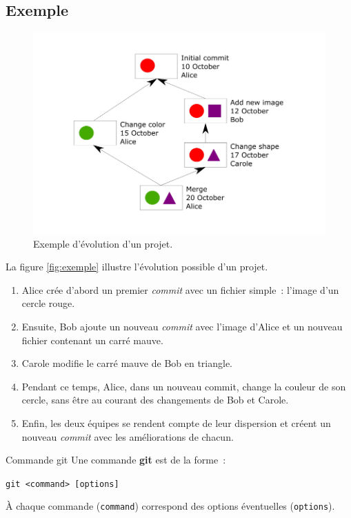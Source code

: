 \documentclass[a4paper,11pt]{style-esi/td}
\newcommand{\git}{\textbf{git}\xspace}
\begin{document}
\subsection{Exemple}

\begin{figure}[h]
	\centering
	\includegraphics[width=.9\linewidth]{img/exemple.png}
	\caption{Exemple d'évolution d'un projet.}
	\label{fig:exemple}
\end{figure}

La figure \vref{fig:exemple} illustre l’évolution possible d’un projet. 

\begin{enumerate}

	\item Alice crée d’abord un premier \textit{commit} avec un fichier simple~: 
		l’image d’un cercle rouge. 
		
	\item Ensuite, Bob ajoute un nouveau \textit{commit} avec l’image d’Alice et un 
		nouveau fichier contenant un carré mauve. 
		
	\item Carole modifie le carré mauve de Bob en triangle. 
		
	\item Pendant ce temps, Alice, dans un nouveau commit, change la couleur de 
		son cercle, sans être au courant des changements de Bob et Carole. 
		
	\item Enfin, les deux équipes se rendent compte de leur dispersion et créent 
		un nouveau \textit{commit} avec les améliorations de chacun. 

\end{enumerate}

\begin{theorie}{Commande git}
	Une commande \git est de la forme~:

	\bigskip
	\texttt{\Large git <command> [options]}
	\bigskip

	À chaque commande (\texttt{command}) correspond des options éventuelles
	(\texttt{options}).

\end{theorie}
\end{document}
